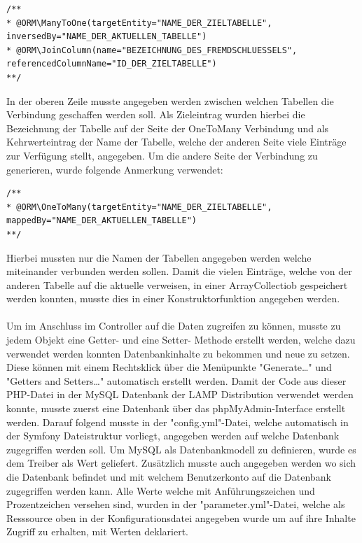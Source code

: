 	\lstset{language=php}
  	\begin{lstlisting}
/**
* @ORM\ManyToOne(targetEntity="NAME_DER_ZIELTABELLE", 
inversedBy="NAME_DER_AKTUELLEN_TABELLE")
* @ORM\JoinColumn(name="BEZEICHNUNG_DES_FREMDSCHLUESSELS", 
referencedColumnName="ID_DER_ZIELTABELLE")
**/
  	\end{lstlisting}
In der oberen Zeile musste angegeben werden zwischen welchen Tabellen die Verbindung geschaffen werden soll. Als Zieleintrag wurden hierbei die Bezeichnung der Tabelle auf der Seite der OneToMany Verbindung und als Kehrwerteintrag der Name der Tabelle, welche der anderen Seite viele Einträge zur Verfügung stellt, angegeben.
Um die andere Seite der Verbindung zu generieren, wurde folgende Anmerkung verwendet:
	
	\lstset{language=php}
  	\begin{lstlisting}
/**
* @ORM\OneToMany(targetEntity="NAME_DER_ZIELTABELLE", 
mappedBy="NAME_DER_AKTUELLEN_TABELLE")
**/
  	\end{lstlisting}
Hierbei mussten nur die Namen der Tabellen angegeben werden welche miteinander verbunden werden sollen. Damit die vielen Einträge, welche von der anderen Tabelle auf die aktuelle verweisen, in einer ArrayCollectiob gespeichert werden konnten, musste dies in einer Konstruktorfunktion angegeben werden.
\\ \\
Um im Anschluss im Controller auf die Daten zugreifen zu können, musste zu jedem Objekt eine Getter- und eine Setter- Methode erstellt werden, welche dazu verwendet werden konnten Datenbankinhalte zu bekommen und neue zu setzen. Diese können mit einem Rechtsklick über die Menüpunkte "Generate…" und "Getters and Setters…" automatisch erstellt werden.
Damit der Code aus dieser PHP-Datei in der MySQL Datenbank der LAMP Distribution verwendet werden konnte, musste zuerst eine Datenbank über das phpMyAdmin-Interface erstellt werden. Darauf folgend musste in der "config.yml"-Datei, welche automatisch in der Symfony Dateistruktur vorliegt, angegeben werden auf welche Datenbank zugegriffen werden soll.
Um MySQL als Datenbankmodell zu definieren, wurde es dem Treiber als Wert geliefert. Zusätzlich musste auch angegeben werden wo sich die Datenbank befindet und mit welchem Benutzerkonto auf die Datenbank zugegriffen werden kann.
Alle Werte welche mit Anführungszeichen und Prozentzeichen versehen sind, wurden in der "parameter.yml"-Datei, welche als Resssource oben in der Konfigurationsdatei angegeben wurde um auf ihre Inhalte Zugriff zu erhalten, mit Werten deklariert.

